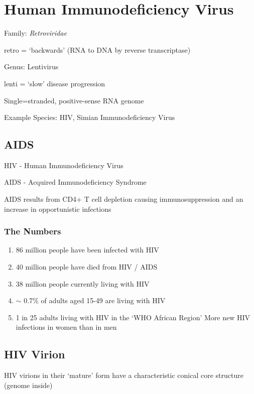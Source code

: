 \documentclass{notes}
\begin{document}
\section{Human Immunodeficiency Virus}

Family: \textit{Retroviridae}

\tab retro = `backwards' (RNA to DNA by reverse transcriptase)

Genus: Lentivirus

\tab lenti = `slow' disease progression

Single=stranded, positive-sense RNA genome

Example Species: HIV, Simian Immunodeficiency Virus

\subsection{AIDS}

HIV - Human Immunodeficiency Virus

AIDS - Acquired Immunodeficiency Syndrome

AIDS results from CD4+ T cell depletion causing immunosuppression and an increase in opportunistic infections

\subsubsection{The Numbers}

\begin{enumerate}
    \item 86 million people have been infected with HIV
    \item 40 million people have died from HIV / AIDS
    \item 38 million people currently living with HIV
    \item \(\sim\) 0.7\% of adults aged 15-49 are living with HIV
    \item 1 in 25 adults living with HIV in the `WHO African Region'
    \subitem More new HIV infections in women than in men
\end{enumerate}

\subsection{HIV Virion}


HIV virions in their `mature' form have a characteristic conical core structure (genome inside)
\end{document}
